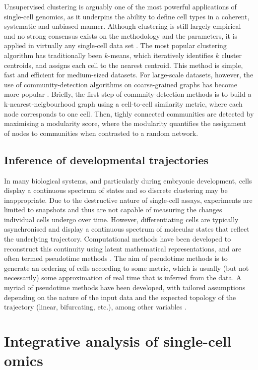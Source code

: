 Unsupervised clustering is arguably one of the most powerful applications of single-cell genomics, as it underpins the ability to define cell types in a coherent, systematic and unbiased manner. Although clustering is still largely empirical and no strong consensus exists on the methodology and the parameters, it is applied in virtually any single-cell data set \cite{Kiselev2019}. The most popular clustering algorithm has traditionally been $k$-means, which iteratively identifies $k$ cluster centroids, and assigns each cell to the nearest centroid. This method is simple, fast and efficient for medium-sized datasets. For large-scale datasets, however, the use of community-detection algorithms on coarse-grained graphs has become more popular \cite{Luecken2019}. Briefly, the first step of commnity-detection methods is to build a k-nearest-neigbourhood graph using a cell-to-cell similarity metric, where each node corresponds to one cell. Then, tighly connected communities are detected by maximising a modularity score, where the modularity quantifies the assignment of nodes to communities when contrasted to a random network.

\subsection{Inference of developmental trajectories}

In many biological systems, and particularly during embryonic development, cells display a continuous spectrum of states and so discrete clustering may be inappropriate. Due to the destructive nature of single-cell assays, experiments are limited to snapshots and thus are not capable of measuring the changes individual cells undergo over time. However, differentiating cells are typically asynchronised and display a continuous spectrum of molecular states that reflect the underlying trajectory. Computational methods have been developed to reconstruct this continuity using latent mathematical representations, and are often termed pseudotime methods \cite{Saelens2019}. The aim of pseudotime methods is to generate an ordering of cells according to some metric, which is usually (but not necessarily) some approximation of real time that is inferred from the data. A myriad of pseudotime methods have been developed, with tailored assumptions depending on the nature of the input data and the expected topology of the trajectory (linear, bifurcating, etc.), among other variables \cite{Saelens2019}. 

\section{Integrative analysis of single-cell omics}


